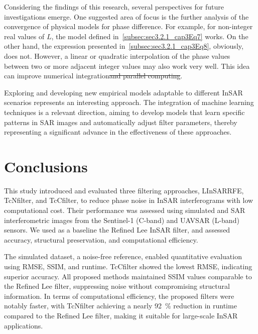 \documentclass[remotesensing,article,submit,pdftex,moreauthors]{Definitions/mdpi}
\makeatletter
\providecommand{\DIFdel}[1]{{\protect\color{red}\sout{#1}}} %
\providecommand{\DIFdelbegin}{} %
\providecommand{\DIFdelend}{} %
\let\sout@orig\sout %
\renewcommand{\sout}[1]{\ifmmode\text{\sout@orig{\ensuremath{#1}}}\else\sout@orig{#1}\fi} %
\makeatother
\begin{document}
Considering the findings of this research, several perspectives for future investigations emerge. One suggested area of focus is the further analysis of the convergence of physical models for phase difference. For example, for non-integer real values of $L$, the model defined in~\eqref{subsec:sec3.2.1_cap3Eq7} works. 
On the other hand, the expression presented in~\eqref{subsec:sec3.2.1_cap3Eq8}, obviously, does not. 
However, a linear or quadratic interpolation of the phase values between two or more adjacent integer values may also work very well. 
This idea can improve numerical integration\DIFdelbegin \DIFdel{and parallel computing}\DIFdelend .


Exploring and developing new empirical models adaptable to different InSAR scenarios represents an interesting approach. 
The integration of machine learning techniques is a relevant direction, aiming to develop models that learn specific patterns in SAR images and automatically adjust filter parameters, thereby representing a significant advance in the effectiveness of these approaches.

\section{Conclusions}\label{sec:conclusions}

This study introduced and evaluated three filtering approaches, LInSARRFE, TcNfilter, and TcCfilter, to reduce phase noise in InSAR interferograms with low computational cost. 
Their performance was assessed using simulated and SAR interferometric images from the Sentinel-1 (C-band) and UAVSAR (L-band) sensors. 
We used as a baseline the Refined Lee InSAR filter, and assessed accuracy, structural preservation, and computational efficiency.

The simulated dataset, a noise-free reference, enabled quantitative evaluation using RMSE, SSIM, and runtime. 
TcCfilter showed the lowest RMSE, indicating superior accuracy. 
All proposed methods maintained SSIM values comparable to the Refined Lee filter, suppressing noise without compromising structural information. 
In terms of computational efficiency, the proposed filters were notably faster, with TcNfilter achieving a nearly \qty{92}{\percent} reduction in runtime compared to the Refined Lee filter, making it suitable for large-scale InSAR applications.
\end{document}
